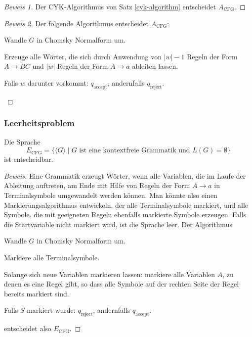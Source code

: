 \begin{proof}[Beweis 1]
Der CYK-Algorithmus von Satz \ref{cyk-algorithm} entscheidet
$A_{\text{CFG}}$.
\end{proof}

\begin{proof}[Beweis 2]
Der folgende Algorithmus entscheidet
$A_{\text{CFG}}$:
\medskip
\begin{compactenum}
\item Wandle $G$ in Chomsky Normalform um.
\item Erzeuge alle Wörter, die sich durch Anwendung
von $|w|-1$ Regeln der Form $A\to BC$ und $|w|$ Regeln
der Form $A\to a$ ableiten lassen.
\item Falls $w$ darunter vorkommt: $q_{\text{accept}}$, 
andernfalls $q_{\text{reject}}$.
\end{compactenum}
\medskip
\end{proof}

\subsubsection{Leerheitsproblem}
%
\begin{satz}
Die Sprache
\[
E_{\text{CFG}}=\{
\langle G\rangle\;|\; \text{$G$ ist eine kontextfreie Grammatik und $L(G)=\emptyset$}
\}
\]
ist entscheidbar.
%
\end{satz}

\begin{proof}[Beweis]
Eine Grammatik erzeugt Wörter, wenn alle Variablen, die im Laufe
der Ableitung auftreten, am Ende mit Hilfe von Regeln der Form $A\to a$
in Terminalsymbole umgewandelt werden können.
Man könnte also einen
Markierungsalgorithmus entwickeln, der alle Terminalsymbole markiert,
und alle Symbole, die mit geeigneten Regeln ebenfalls markierte Symbole
erzeugen.
Falls die Startvariable nicht markiert wird, ist die Sprache leer.
Der Algorithmus 
\medskip
\begin{compactenum}
\item Wandle $G$ in Chomsky Normalform um.
\item Markiere alle Terminalsymbole.
\item Solange sich neue Variablen markieren lassen: markiere alle
Variablen $A$, zu denen es eine Regel gibt, so dass alle Symbole auf
der rechten Seite der Regel bereits markiert sind.
\item Falls $S$ markiert wurde: $q_{\text{reject}}$, andernfalls
$q_{\text{accept}}$.
\end{compactenum}
\medskip
entscheidet also
$E_{\text{CFG}}$.
\end{proof}

